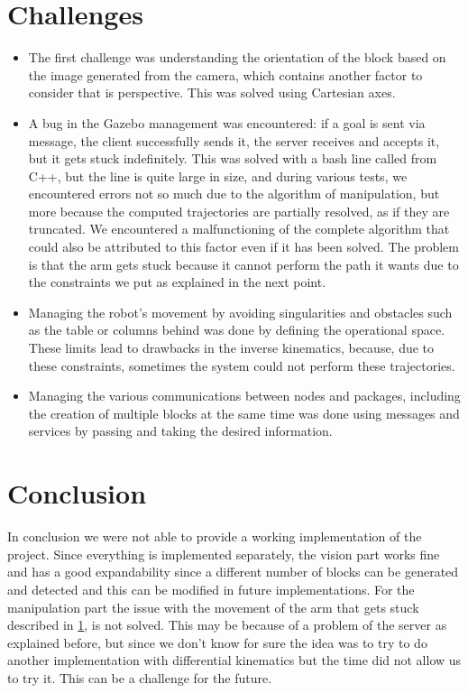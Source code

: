 \documentclass[12pt,a4paper]{article}
\begin{document}
\section{Challenges}\label{sec:challenges}
\begin{itemize}
    \item The first challenge was understanding the orientation of the block based on the image generated from the camera, which contains another factor to consider that is perspective. This was solved using Cartesian axes.
    \item A bug in the Gazebo management was encountered: if a goal is sent via message, the client successfully sends it, the server receives and accepts it, but it gets stuck indefinitely. This was solved with a bash line called from C++, but the line is quite large in size, and during various tests, we encountered errors not so much due to the algorithm of manipulation, but more because the computed trajectories are partially resolved, as if they are truncated. We encountered a malfunctioning of the complete algorithm that could also be attributed to this factor even if it has been solved. The problem is that the arm gets stuck because it cannot perform the path it wants due to the constraints we put as explained in the next point.
    \item Managing the robot’s movement by avoiding singularities and obstacles such as the table or columns behind was done by defining the operational space. These limits lead to drawbacks in the inverse kinematics, because, due to these constraints, sometimes the system could not perform these trajectories.
    \item Managing the various communications between nodes and packages, including the creation of multiple blocks at the same time was done using messages and services by passing and taking the desired information.
\end{itemize}

\section{Conclusion}\label{sec:conclusion}
In conclusion we were not able to provide a working implementation of the project. Since everything is implemented separately, the vision part works fine and has a good expandability since a different number of blocks can be generated and detected and this can be modified in future implementations. For the manipulation part the issue with the movement of the arm that gets stuck described in \ref{sec:challenges}, is not solved. This may be because of a problem of the server as explained before, but since we don't know for sure the idea was to try to do another implementation with differential kinematics but the time did not allow us to try it. This can be a challenge for the future.
\end{document}
